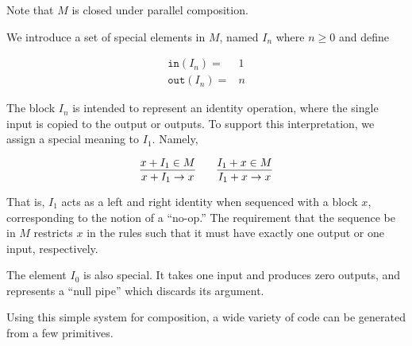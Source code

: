 Note that $M$ is closed under parallel composition.

We introduce a set of special elements in $M$, named $I_n$ where $n \geq 0$
and define

\begin{eqnarray*}
\mathtt{in} (I_n) =& 1\\
\mathtt{out}(I_n) =& n
\end{eqnarray*}

The block $I_n$ is intended to represent an identity operation, where the
single input is copied to the output or outputs. To support this
interpretation, we assign a special meaning to $I_1$. Namely,

\[
\infer{x + I_1 \to x}{x + I_1 \in M} 
\qquad
\infer{I_1 + x \to x}{I_1 + x \in M}
\]

That is, $I_1$ acts as a left and right identity when sequenced with a block
$x$, corresponding to the notion of a ``no-op.'' The requirement that the
sequence be in $M$ restricts $x$ in the rules such that it must have exactly
one output or one input, respectively.

The element $I_0$ is also special. It takes one input and produces zero
outputs, and represents a ``null pipe'' which discards its argument.

Using this simple system for composition, a wide variety of code can be
generated from a few primitives.
